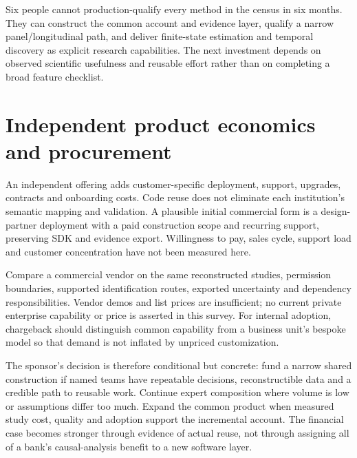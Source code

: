 Six people cannot production-qualify every method in the census in six
months. They can construct the common account and evidence layer, qualify
a narrow panel/longitudinal path, and deliver finite-state estimation and
temporal discovery as explicit research capabilities. The next investment
depends on observed scientific usefulness and reusable effort rather than
on completing a broad feature checklist.

\section{Independent product economics and procurement}
An independent offering adds customer-specific deployment, support,
upgrades, contracts and onboarding costs. Code reuse does not eliminate
each institution's semantic mapping and validation. A plausible initial
commercial form is a design-partner deployment with a paid construction
scope and recurring support, preserving SDK and evidence export.
Willingness to pay, sales cycle, support load and customer concentration
have not been measured here.

Compare a commercial vendor on the same reconstructed studies, permission
boundaries, supported identification routes, exported uncertainty and
dependency responsibilities. Vendor demos and list prices are insufficient;
no current private enterprise capability or price is asserted in this survey.
For internal adoption, chargeback should distinguish common capability
from a business unit's bespoke model so that demand is not inflated by
unpriced customization.

The sponsor's decision is therefore conditional but concrete: fund a narrow
shared construction if named teams have repeatable decisions, reconstructible
data and a credible path to reusable work. Continue expert composition where
volume is low or assumptions differ too much. Expand the common product
when measured study cost, quality and adoption support the incremental
account. The financial case becomes stronger through evidence of actual
reuse, not through assigning all of a bank's causal-analysis benefit to a
new software layer.
